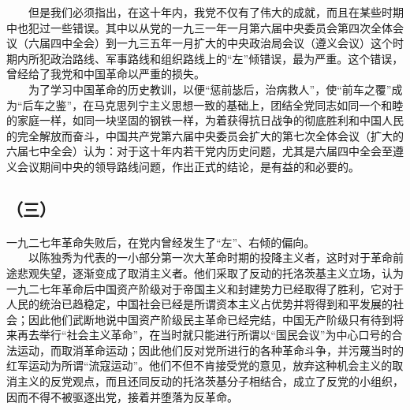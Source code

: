 \documentclass[cn,11pt,chinese]{elegantbook}
\def\myformat#1{\hfil\hfil #1}
\begin{document}
　　但是我们必须指出，在这十年内，我党不仅有了伟大的成就，而且在某些时期中也犯过一些错误。其中以从党的一九三一年一月第六届中央委员会第四次全体会议（六届四中全会）到一九三五年一月扩大的中央政治局会议（遵义会议）这个时期内所犯政治路线、军事路线和组织路线上的“左”倾错误，最为严重。这个错误，曾经给了我党和中国革命以严重的损失。\\
　　为了学习中国革命的历史教训，以便“惩前毖后，治病救人”，使“前车之覆”成为“后车之鉴”，在马克思列宁主义思想一致的基础上，团结全党同志如同一个和睦的家庭一样，如同一块坚固的钢铁一样，为着获得抗日战争的彻底胜利和中国人民的完全解放而奋斗，中国共产党第六届中央委员会扩大的第七次全体会议（扩大的六届七中全会）认为：对于这十年内若干党内历史问题，尤其是六届四中全会至遵义会议期间中央的领导路线问题，作出正式的结论，是有益的和必要的。\\
\subsection*{\myformat{（三）}}
一九二七年革命失败后，在党内曾经发生了“左”、右倾的偏向。\\
　　以陈独秀为代表的一小部分第一次大革命时期的投降主义者，这时对于革命前途悲观失望，逐渐变成了取消主义者。他们采取了反动的托洛茨基主义立场，认为一九二七年革命后中国资产阶级对于帝国主义和封建势力已经取得了胜利，它对于人民的统治已趋稳定，中国社会已经是所谓资本主义占优势并将得到和平发展的社会；因此他们武断地说中国资产阶级民主革命已经完结，中国无产阶级只有待到将来再去举行“社会主义革命”，在当时就只能进行所谓以“国民会议”为中心口号的合法运动，而取消革命运动；因此他们反对党所进行的各种革命斗争，并污蔑当时的红军运动为所谓“流寇运动”。他们不但不肯接受党的意见，放弃这种机会主义的取消主义的反党观点，而且还同反动的托洛茨基分子相结合，成立了反党的小组织，因而不得不被驱逐出党，接着并堕落为反革命。\\
\end{document}
